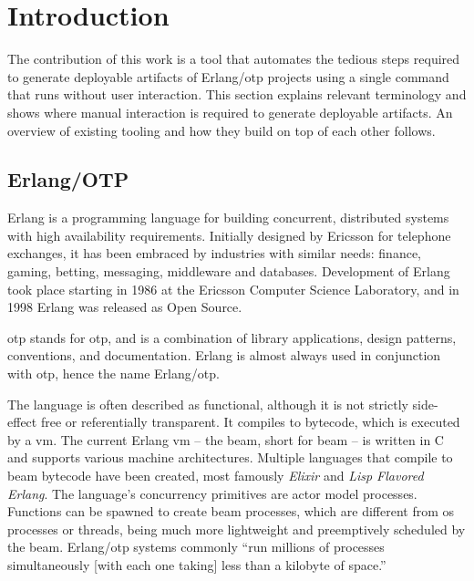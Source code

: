 \section{Introduction}

The contribution of this work is a tool that automates the tedious steps required to generate deployable artifacts of Erlang/\acrshort{otp} projects using a single command that runs without user interaction.
This section explains relevant terminology and shows where manual interaction is required to generate deployable artifacts. An overview of existing tooling and how they build on top of each other follows.

\subsection{Erlang/OTP}

Erlang is a programming language for building concurrent, distributed systems with high availability requirements. Initially designed by Ericsson for telephone exchanges, it has been embraced by industries with similar needs: finance, gaming, betting, messaging, middleware and databases. Development of Erlang took place starting in 1986 at the Ericsson Computer Science Laboratory, and in 1998 Erlang was released as Open Source.~\cite{armstrong2007history}

\acrshort{otp} stands for \acrlong{otp}, and is a combination of library applications, design patterns, conventions, and documentation. Erlang is almost always used in conjunction with \acrshort{otp}, hence the name Erlang/\acrshort{otp}.~\cite{ferd}

The language is often described as functional, although it is not strictly side-effect free or referentially transparent. It compiles to bytecode, which is executed by a \acrfull{vm}. The current Erlang \acrshort{vm} – the \acrshort{beam}, short for \acrlong{beam} – is written in C and supports various machine architectures. Multiple languages that compile to \acrshort{beam} bytecode have been created, most famously \emph{Elixir} and \emph{Lisp Flavored Erlang}. The language's concurrency primitives are actor model processes. Functions can be spawned to create \acrshort{beam} processes, which are different from \acrshort{os} processes or threads, being much more lightweight and preemptively scheduled by the \acrshort{beam}. Erlang/\acrshort{otp} systems commonly ``run millions of processes simultaneously [with each one taking] less than a kilobyte of space.''~\cite{larson}

